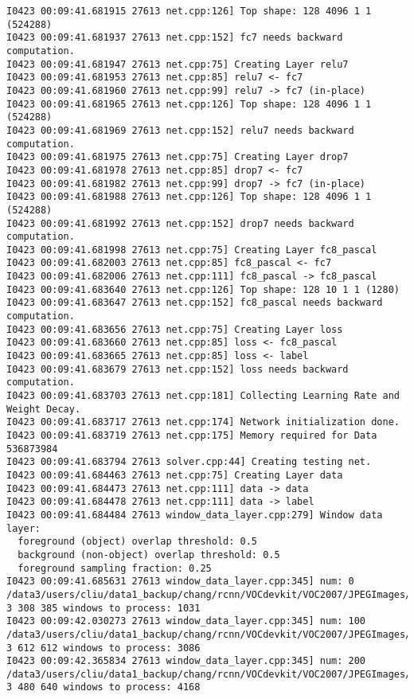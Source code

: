 \documentclass[a4]{article}
\begin{document}
\begin{lstlisting}
I0423 00:09:41.681915 27613 net.cpp:126] Top shape: 128 4096 1 1 (524288)
I0423 00:09:41.681937 27613 net.cpp:152] fc7 needs backward computation.
I0423 00:09:41.681947 27613 net.cpp:75] Creating Layer relu7
I0423 00:09:41.681953 27613 net.cpp:85] relu7 <- fc7
I0423 00:09:41.681960 27613 net.cpp:99] relu7 -> fc7 (in-place)
I0423 00:09:41.681965 27613 net.cpp:126] Top shape: 128 4096 1 1 (524288)
I0423 00:09:41.681969 27613 net.cpp:152] relu7 needs backward computation.
I0423 00:09:41.681975 27613 net.cpp:75] Creating Layer drop7
I0423 00:09:41.681978 27613 net.cpp:85] drop7 <- fc7
I0423 00:09:41.681982 27613 net.cpp:99] drop7 -> fc7 (in-place)
I0423 00:09:41.681988 27613 net.cpp:126] Top shape: 128 4096 1 1 (524288)
I0423 00:09:41.681992 27613 net.cpp:152] drop7 needs backward computation.
I0423 00:09:41.681998 27613 net.cpp:75] Creating Layer fc8_pascal
I0423 00:09:41.682003 27613 net.cpp:85] fc8_pascal <- fc7
I0423 00:09:41.682006 27613 net.cpp:111] fc8_pascal -> fc8_pascal
I0423 00:09:41.683640 27613 net.cpp:126] Top shape: 128 10 1 1 (1280)
I0423 00:09:41.683647 27613 net.cpp:152] fc8_pascal needs backward computation.
I0423 00:09:41.683656 27613 net.cpp:75] Creating Layer loss
I0423 00:09:41.683660 27613 net.cpp:85] loss <- fc8_pascal
I0423 00:09:41.683665 27613 net.cpp:85] loss <- label
I0423 00:09:41.683679 27613 net.cpp:152] loss needs backward computation.
I0423 00:09:41.683703 27613 net.cpp:181] Collecting Learning Rate and Weight Decay.
I0423 00:09:41.683717 27613 net.cpp:174] Network initialization done.
I0423 00:09:41.683719 27613 net.cpp:175] Memory required for Data 536873984
I0423 00:09:41.683794 27613 solver.cpp:44] Creating testing net.
I0423 00:09:41.684463 27613 net.cpp:75] Creating Layer data
I0423 00:09:41.684473 27613 net.cpp:111] data -> data
I0423 00:09:41.684478 27613 net.cpp:111] data -> label
I0423 00:09:41.684484 27613 window_data_layer.cpp:279] Window data layer:
  foreground (object) overlap threshold: 0.5
  background (non-object) overlap threshold: 0.5
  foreground sampling fraction: 0.25
I0423 00:09:41.685631 27613 window_data_layer.cpp:345] num: 0 /data3/users/cliu/data1_backup/chang/rcnn/VOCdevkit/VOC2007/JPEGImages/COCO_val2014_000000237277.jpg 3 308 385 windows to process: 1031
I0423 00:09:42.030273 27613 window_data_layer.cpp:345] num: 100 /data3/users/cliu/data1_backup/chang/rcnn/VOCdevkit/VOC2007/JPEGImages/COCO_val2014_000000067431.jpg 3 612 612 windows to process: 3086
I0423 00:09:42.365834 27613 window_data_layer.cpp:345] num: 200 /data3/users/cliu/data1_backup/chang/rcnn/VOCdevkit/VOC2007/JPEGImages/COCO_val2014_000000134133.jpg 3 480 640 windows to process: 4168

\end{lstlisting}
\end{document}
